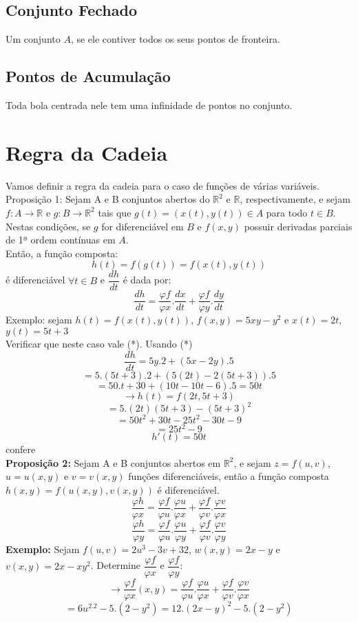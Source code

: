\documentclass{article}
\begin{document}
		\subsection{Conjunto Fechado}
			Um conjunto $A$, se ele contiver todos os seus pontos de fronteira.
		\subsection{Pontos de Acumulação}
			Toda bola centrada nele tem uma infinidade de pontos no conjunto.
	
	\section{Regra da Cadeia}
		Vamos definir a regra da cadeia para o caso de funções de várias variáveis.\\
		Proposição 1: Sejam A e B conjuntos abertos do $\mathbb{R}^2$ e $\mathbb{R}$, respectivamente, e sejam $f:A \to \mathbb{R}$ e $g:B \to \mathbb{R}^2$ tais que $g(t) = (x(t),y(t)) \in A$ para todo $t \in B$. Nestas condições, se $g$ for diferenciável em $B$ e $f(x,y)$ possuir derivadas parciais de 1ª ordem contínuas em $A$.\\
		Então, a função composta:\\
			$$h(t)= f(g(t))=f(x(t),y(t))$$
		é diferenciável $\forall t \in B$ e $\dfrac{dh}{dt}$ é dada por:
			$$\dfrac{dh}{dt} = \dfrac{\varphi f}{\varphi x}. \dfrac{dx}{dt}+\dfrac{\varphi f}{\varphi y}.\dfrac{dy}{dt}$$
		Exemplo: sejam $h(t)=f(x(t),y(t))$, $f(x,y)=5xy-y^2$ e $x(t) = 2t$, $y(t)=5t+3$\\
		Verificar que neste caso vale (*). Usando (*)\\
		$$\dfrac{dh}{dt} = 5y.2+(5x-2y).5$$
		$$=5.(5t+3).2+(5(2t)-2(5t+3)).5$$
		$$=50.t+30+(10t-10t-6).5 = 50t$$
		$$\to h(t) = f(2t,5t+3)$$
		$$=5.(2t)(5t+3)-(5t+3)^2$$
		$$=50t^2+30t-25t^2-30t-9$$
		$$= 25t^2-9$$
		$$h'(t) = 50t$$
		confere\\
		\textbf{Proposição 2:} Sejam A e B conjuntos abertos em $\mathbb{R}^2$, e sejam $z=f(u,v)$, $u=u(x,y)$ e $v=v(x,y)$ funções diferenciáveis, então a função composta $h(x,y) = f(u(x,y),v(x,y))$ é diferenciável.
		$$\dfrac{\varphi h}{\varphi x} = \dfrac{\varphi f}{\varphi u} . \dfrac{\varphi u}{\varphi x} +\dfrac{\varphi f}{\varphi v}. \dfrac{\varphi v}{\varphi x}$$
		$$\dfrac{\varphi h}{\varphi y} = \dfrac{\varphi f}{\varphi u}.\dfrac{\varphi u}{\varphi y}+\dfrac{\varphi f}{\varphi v}.\dfrac{\varphi v}{\varphi y}$$
		\textbf{Exemplo:} Sejam $f(u,v) =2u^3-3v+3	2$, $w(x,y)=2x-y$ e $v(x,y)=2x - xy^2$. Determine $\dfrac{\varphi f}{\varphi x}$ e $\dfrac{\varphi f}{\varphi y}$:
		$$\to \dfrac{\varphi f}{\varphi x}(x,y)=\dfrac{\varphi f}{\varphi u}.\dfrac{\varphi u}{\varphi x} + \dfrac{\varphi f}{\varphi v}. \dfrac{\varphi v}{\varphi x}$$	
		$$= 6u^2.2-5.(2-y^2)= 12.(2x-y)^2-5.(2-y^2)$$		
		
\end{document}
